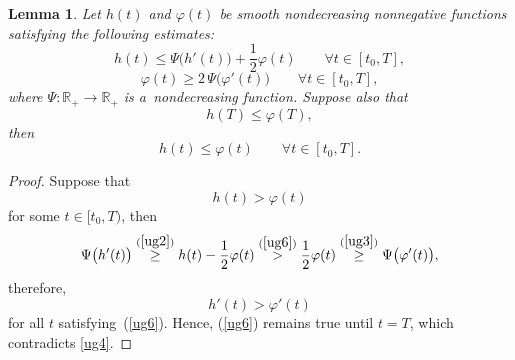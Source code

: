 \documentclass[11pt]{article}
\newtheorem{lemma}[theorem]{Lemma}
\numberwithin{equation}{section}
\numberwithin{figure}{section}
\newcommand{\R}{\mathbb{R}}
\def\R{{\mathbb R}}
\def\vp{{\varphi}}
\begin{document}
\begin{lemma}\label{cc-l1} {\sl Let $h(t)$ and $\varphi(t)$ be smooth nondecreasing nonnegative functions satisfying the following estimates:
\begin{equation}\label{ug2}h(t)\le\Psi\bigl(h'(t)\bigr)+\frac12\varphi(t)\qquad\forall t\in[t_0,T],
\end{equation}
\begin{equation}\label{ug3}\vp(t)\ge 2\,\Psi\bigl(\vp'(t)\bigr)\qquad\forall t\in[t_0,T],\end{equation}
where $\Psi:\R_+\to\R_+$ is a~nondecreasing function. Suppose also that
\begin{equation}\label{ug4}h(T)\le \vp(T),\end{equation}
then
\begin{equation}\label{ug5}h(t)\le \vp(t)\qquad
\forall t\in [t_0,T].\end{equation}}
\end{lemma}

\medskip

\begin{proof}
 	 Suppose that
	\begin{equation}\label{ug6}h(t)>\vp(t)\end{equation}
	for some $t\in [t_0,T)$, then
	$$\Psi\bigl(h'(t)\bigr)\overset{(\ref{ug2})}\ge h(t)-\frac12\vp(t)\overset{(\ref{ug6})}>\frac12\vp(t)\overset{(\ref{ug3})}\ge\Psi\bigl(\vp'(t)\bigr),$$
	therefore,
	$$h'(t)>\vp'(t)$$
	for all $t$ satisfying~(\ref{ug6}). Hence, (\ref{ug6}) remains true until $t=T$, which contradicts \eqref{ug4}.
\end{proof}  
\end{document}
